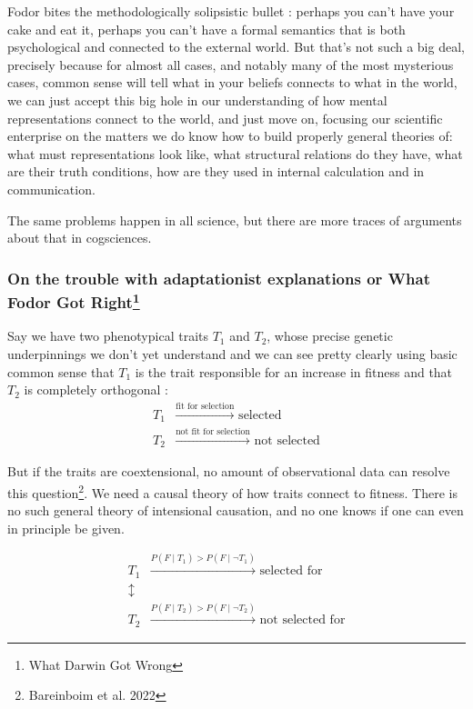 \documentclass{cours}
\begin{document}
Fodor bites the methodologically solipsistic bullet\! : perhaps you can't have your cake and eat it, perhaps you can't have a formal semantics that is both psychological and connected to the external world. But that's not such a big deal, precisely because for almost all cases, and notably many of the most mysterious cases, common sense will tell what in your beliefs connects to what in the world, we can just accept this big hole in our understanding of how mental representations connect to the world, and just move on, focusing our scientific enterprise on the matters we do know how to build properly general theories of\!: what must representations look like, what structural relations do they have, what are their truth conditions, how are they used in internal calculation and in communication.

The same problems happen in all science, but there are more traces of arguments about that in cogsciences.

\subsubsection[On the trouble with adaptationist explanations or What Fodor Got Right]{On the trouble with adaptationist explanations or What Fodor Got Right\footnote{What Darwin Got Wrong}}
Say we have two phenotypical traits $T_{1}$ and $T_{2}$, whose precise genetic underpinnings we don't yet understand and we can see pretty clearly using basic common sense that $T_{1}$ is the trait responsible for an increase in fitness and that $T_{2}$ is completely orthogonal\! :
\[
    \begin{aligned}
        T_{1} & \xrightarrow{\text{fit for selection}} \text{ selected}         \\
        T_{2} & \xrightarrow{\text{not fit for selection}} \text{ not selected}
    \end{aligned}
\]

But if the traits are coextensional, no amount of observational data can resolve this question\footnote{Bareinboim et al. 2022}. We need a causal theory of how traits connect to fitness. There is no such general theory of intensional causation, and no one knows if one can even in principle be given.

\[
    \begin{aligned}
        T_{1}        & \xrightarrow{P(F\mid T_{1}) > P(F\mid \lnot T_{1})} \text{ selected for}     \\
        \updownarrow &                                                                              \\
        T_{2}        & \xrightarrow{P(F\mid T_{2}) > P(F\mid \lnot T_{2})} \text{ not selected for}
    \end{aligned}
\]
\end{document}
